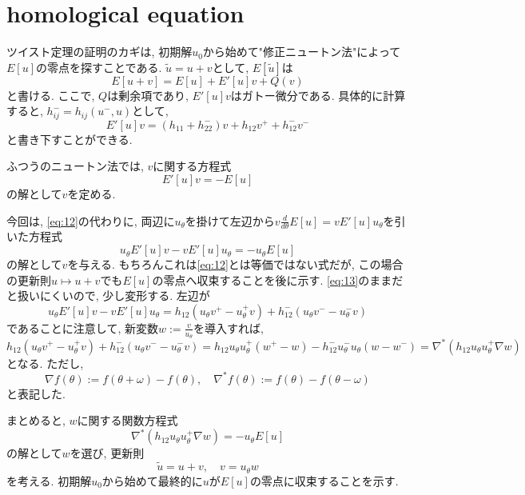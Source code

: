 \documentclass[a4paper]{ujarticle}
\numberwithin{equation}{section}
\theoremstyle{definition}
\begin{document}
        \section{homological equation}
        ツイスト定理の証明のカギは, 初期解$u_0$から始めて"修正ニュートン法"によって$E[u]$の零点を探すことである.
        $\tilde{u} = u + v$として, $E[\tilde{u}]$は
        \[
            E[u + v] = E[u] + E'[u] v + Q(v)
        \]
        と書ける. ここで, $Q$は剰余項であり, $E'[u]v$はガトー微分である.
        具体的に計算すると, $h_{ij}^{-} = h_{ij}(u^{-}, u)$として, 
        \begin{equation} \label{eq:11}
            E'[u] v = (h_{11} + h_{22}^{-})v + h_{12} v^{+} + h_{12}^{-} v^{-}
        \end{equation}
        と書き下すことができる.

        ふつうのニュートン法では, $v$に関する方程式
        \begin{equation} \label{eq:12}
            E'[u] v = - E[u]
        \end{equation}
        の解として$v$を定める.

        今回は, \eqref{eq:12}の代わりに, 両辺に$u_{\theta}$を掛けて左辺から$v \frac{d}{d \theta} E[u] = v E'[u] u_{\theta}$を引いた方程式
        \begin{equation} \label{eq:13}
            u_{\theta} E'[u] v - v E'[u] u_{\theta} = - u_{\theta} E[u]
        \end{equation}
        の解として$v$を与える. もちろんこれは\eqref{eq:12}とは等価ではない式だが, この場合の更新則$u \mapsto u + v$でも$E[u]$の零点へ収束することを後に示す.
        \eqref{eq:13}のままだと扱いにくいので, 少し変形する. 左辺が
        \[
            u_{\theta} E'[u] v - v E'[u] u_{\theta} = h_{12}(u_{\theta} v^{+} - u_{\theta}^{+} v) + h_{12}^{-}(u_{\theta} v^{-} - u_{\theta}^{-} v)
        \]
        であることに注意して, 新変数$w := \frac{v}{u_{\theta}}$を導入すれば, 
        \[
            h_{12}(u_{\theta} v^{+} - u_{\theta}^{+} v) + h_{12}^{-}(u_{\theta} v^{-} - u_{\theta}^{-} v) = h_{12} u_{\theta} u_{\theta}^{+}(w^{+} -  w) - h_{12}^{-} u^{-}_{\theta} u_{\theta} (w - w^{-}) = \nabla^{*}(h_{12} u_{\theta} u_{\theta}^{+} \nabla w )
        \]
        となる. ただし, 
        \[
            \nabla f(\theta) := f(\theta + \omega) - f(\theta), \quad \nabla^{*} f(\theta) := f(\theta) - f(\theta - \omega)
        \]
        と表記した.

        まとめると, $w$に関する関数方程式
        \begin{equation} \label{eq:14}
            \nabla^{*}(h_{12} u_{\theta} u_{\theta}^{+} \nabla w ) = - u_{\theta} E[u]
        \end{equation}
        の解として$w$を選び, 更新則
        \begin{equation} \label{eq:15}
            \tilde{u} = u + v, \quad v = u_{\theta} w
        \end{equation}
        を考える. 初期解$u_0$から始めて最終的に$u$が$E[u]$の零点に収束することを示す.
\end{document}
